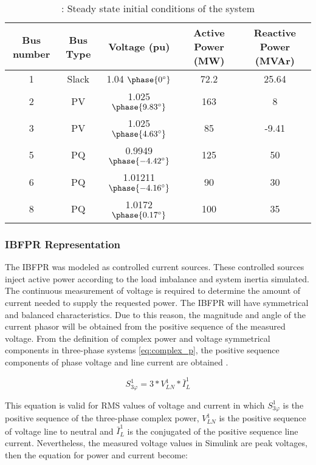 \begin{table}[h]
	\caption{\label{tb:initial}: Steady state initial conditions of the system}
	\centering
	\begin{tabular}{ccccc}
		\toprule
		\textbf{Bus number}    & \textbf{Bus Type}    & \textbf{Voltage (pu)}& \textbf{Active Power (MW)}& \textbf{Reactive Power (MVAr)}\\
		\midrule
		1 & Slack & 1.04 $\phase{0^{\circ}} $ & 72.2 & 25.64 \\
		2 & PV & 1.025 $\phase{9.83^{\circ}} $ & 163 & 8 \\
		3 & PV & 1.025 $\phase{4.63^{\circ}} $ & 85 & -9.41 \\
		5 & PQ & 0.9949 $\phase{-4.42^{\circ}} $ &125 & 50 \\
		6 & PQ & 1.01211 $\phase{-4.16^{\circ}} $ & 90 & 30 \\
		8 & PQ & 1.0172 $ \phase{0.17^{\circ}} $ & 100 & 35 \\
		
		\bottomrule
	\end{tabular}
\end{table}


\subsubsection{IBFPR Representation}


The IBFPR was modeled as controlled current sources. These controlled sources inject active power according to the load imbalance and system inertia simulated. The continuous measurement of voltage is required to determine the amount of current needed to supply the requested power. The IBFPR will have symmetrical and balanced characteristics. Due to this reason, the magnitude and angle of the current phasor will be obtained from the positive sequence of the measured voltage. From the definition of complex power and voltage symmetrical components in three-phase systems \eqref{eq:complex_p}, the positive sequence components of phase voltage and line current are obtained \cite{john1994power}.

\begin{equation}
\label{eq:complex_p}
S_{3\varphi}^1=3*V_{LN}^1*\bar{I}_{L}^1
\end{equation}

This equation is valid for RMS values of voltage and current in which $ S_{3\varphi}^1 $ is the positive sequence of the three-phase complex power, $ V_{LN}^1 $ is the positive sequence of voltage line to neutral and $ \bar I_{L}^1 $ is the conjugated of the positive sequence line current. Nevertheless, the measured voltage values in Simulink are peak voltages, then the equation for power and current become:

